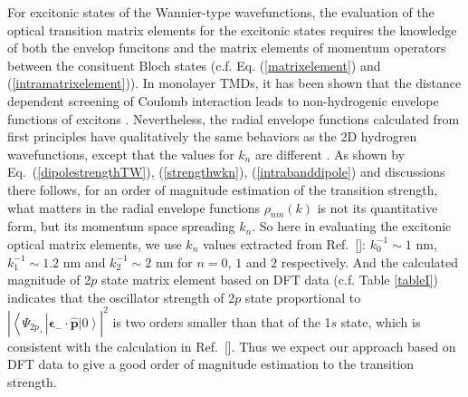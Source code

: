 \documentclass[prb,twocolumn,amsmath,amssymb,superscriptaddress,showpacs]{revtex4}
\begin{document}
For excitonic states of the Wannier-type wavefunctions, the evaluation of the optical transition matrix elements for the excitonic states requires the knowledge of both the envelop funcitons and the matrix elements of momentum operators between the consituent Bloch states (c.f. Eq. (\ref{matrixelement}) and (\ref{intramatrixelement})). In monolayer TMDs, it has been shown that the distance dependent screening of Coulomb interaction leads to non-hydrogenic envelope functions of excitons \cite{S. Louie MoS2 specturm calculation PRL2013, Heinz binding energy PRL2014, Jie Shan binding energy PRL2014, X Zhang S Louie TPA 2014}. Nevertheless, the radial envelope functions calculated from first principles have qualitatively the same behaviors as the 2D hydrogren wavefunctions, except that the values for $k_n$ are different \cite{X Zhang S Louie TPA 2014}. As shown by Eq.~(\ref{dipolestrengthTW}), (\ref{strengthwkn}), (\ref{intrabanddipole}) and discussions there follows, for an order of magnitude estimation of the transition strength, what matters in the radial envelope functions $\rho_{nm}(k)$ is not its quantitative form, but its momentum space spreading $k_n$. So here in evaluating the excitonic optical matrix elements, we use $k_n$ values extracted from Ref.~[]: $k_{0}^{-1}\sim1$ nm, $k_{1}^{-1}\sim1.2$ nm and $k_{2}^{-1}\sim2$ nm for $n=0$, $1$ and $2$ respectively. And the calculated magnitude of 2$p$ state matrix element based on DFT data  (c.f. Table \ref{tableI}) indicates that the oscillator strength of 2$p$ state proportional to $|\left\langle \Psi_{2p_{+}}\right|\mathbf{\epsilon}_{-}\cdot\hat{\mathbf{p}}\left|0\right\rangle|^{2}$ is two orders smaller than that of the 1$s$ state, which is consistent with the calculation in Ref.~[]. Thus we expect our approach based on DFT data to give a good order of magnitude estimation to the transition strength.
\end{document}
